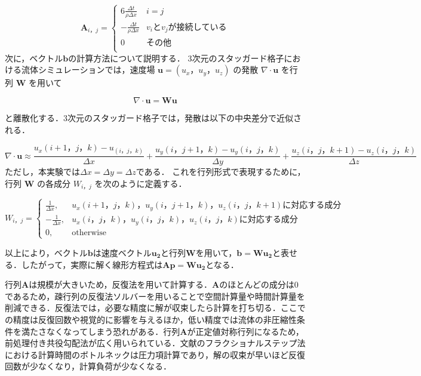 \documentclass[a4j,12pt]{jreport}
\begin{document}
\[
	\bm{A}_{i，j} = 
	\begin{cases}
 	6\frac{\varDelta t}{\rho \varDelta x} 	& i = j\\
 	-\frac{\varDelta t}{\rho \varDelta x}   	& v_iとv_jが接続している\\
 	0  							& その他\\
	\end{cases}
\]
次に，ベクトル$\bm{b}$の計算方法について説明する．
3次元のスタッガード格子における流体シミュレーションでは，速度場 $\bm{u} = (u_x，u_y，u_z)
$ の発散 $\nabla \cdot \bm{u}$ を行列 $\bm{W}$ を用いて

\[
\nabla \cdot \bm{u} = \bm{W} \bm{u}
\]

と離散化する．3次元のスタッガード格子では，発散は以下の中央差分で近似される．

\[
\nabla \cdot \bm{u} \approx \frac{u_x(i+1，j，k) - u_(i，j，k)}{\varDelta x} + \frac{u_y(i，j+1，k)- u_y(i，j，k)}{\varDelta y} + \frac{u_z(i，j，k+1) - u_z(i，j，k)}{\varDelta z}
\]
ただし，本実験では$\varDelta x = \varDelta y= \varDelta z$である．
これを行列形式で表現するために，行列 $\bm{W}$ の各成分 $W_{i，j}$ を次のように定義する．

\begin{equation}
W_{i，j} =
\begin{cases}
\frac{1}{\varDelta x}, &  u_x(i+1，j，k)，u_y(i，j+1，k)，u_z(i，j，k+1)に対応する成分 \\
-\frac{1}{\varDelta x}, & u_x(i，j，k)，u_y(i，j，k)，u_z(i，j，k)に対応する成分\\
0, & \text{otherwise}
\end{cases}
\end{equation}

以上により，ベクトル$\bm{b}$は速度ベクトル$\bm{u_2}$と行列$\bm{W}$を用いて，$\bm{b} = \bm{W}\bm{u_2}$と表せる．したがって，実際に解く線形方程式は$\bm{A}\bm{p} = \bm{W}\bm{u_2}$となる．

行列$\bm{A}$は規模が大きいため，反復法を用いて計算する．$\bm{A}$のほとんどの成分は$0$であるため，疎行列の反復法ソルバーを用いることで空間計算量や時間計算量を削減できる．反復法では，必要な精度に解が収束したら計算を打ち切る．ここでの精度は反復回数や視覚的に影響を与えるほか，低い精度では流体の非圧縮性条件を満たさなくなってしまう恐れがある．行列$\bm{A}$が正定値対称行列になるため，前処理付き共役勾配法が広く用いられている．文献\cite{fedkiw}のフラクショナルステップ法における計算時間のボトルネックは圧力項計算であり，解の収束が早いほど反復回数が少なくなり，計算負荷が少なくなる．
\end{document}
